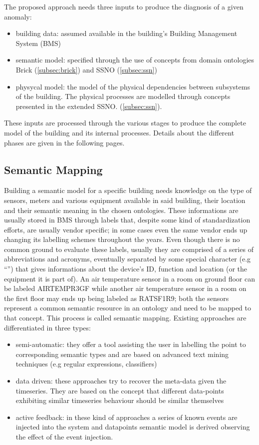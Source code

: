 The proposed approach needs three inputs to produce the diagnosis of a given anomaly:
\begin{itemize}
  \item building data: assumed available in the building's Building Management System (BMS)
  \item semantic model: specified through the use of concepts from domain ontologies Brick (\autoref{subsec:brick}) and SSNO (\autoref{subsec:ssn})
  \item physycal model: the model of the physical dependencies between subsystems of the building. The physical processes are modelled through concepts presented in the extended SSNO. (\autoref{subsec:ssn}).
\end{itemize}
These inputs are processed through the various stages to produce the complete model of the building and its internal processes. Details about the different phases are given in the following pages.

\subsection{Semantic Mapping} \label{subsec:semantic_mapping}
Building a semantic model for a specific building needs knowledge on the type of sensors, meters and various equipment available in said building, their location and their semantic meaning in the chosen ontologies. These informations are usually stored in BMS through labels that, despite some kind of standardization efforts, are usually vendor specific; in some cases even the same vendor ends up changing its labelling schemes throughout the years. Even though there is no common ground to evaluate these labels, usually they are comprised of a series of abbreviations and acronyms, eventually separated by some special character (e.g ``\textunderscore'') that gives informations about the device's ID, function and location (or the equipment it is part of). An air temperature sensor in a room on ground floor can be labeled AIR\textunderscore TEMP\textunderscore R3GF while another air temperature sensor in a room on the first floor may ends up being labeled as RATSF1R9; both the sensors represent a common semantic resource in an ontology and need to be mapped to that concept. This process is called semantic mapping. Existing approaches are differentiated in three types\cite{semantic_mapping}:
\begin{itemize}
  \item semi-automatic: they offer a tool assisting the user in labelling the point to corresponding semantic types and are based on advanced text mining techniques (e.g regular expressions, classifiers)
  \item data driven: these approaches try to recover the meta-data given the timeseries. They are based on the concept that different data-points exhibiting similar timeseries behaviour should be similar themselves
  \item active feedback: in these kind of approaches a series of known events are injected into the system and datapoints semantic model is derived observing the effect of the event injection.
\end{itemize}

